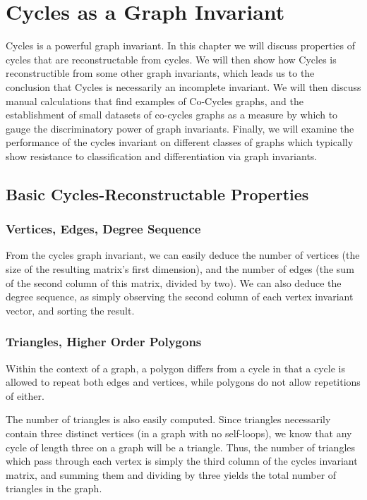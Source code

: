 \chapter{Cycles as a Graph Invariant}
Cycles is a powerful graph invariant.
In this chapter we will discuss properties of cycles that are reconstructable from cycles.
We will then show how Cycles is reconstructible from some other graph invariants, which leads us to the conclusion that Cycles is necessarily an incomplete invariant.
We will then discuss manual calculations that find examples of Co-Cycles graphs, and the establishment of small datasets of co-cycles graphs as a measure by which to gauge the discriminatory power of graph invariants.
Finally, we will examine the performance of the cycles invariant on different classes of graphs which typically show resistance to classification and differentiation via graph invariants.

\section{Basic Cycles-Reconstructable Properties}

\subsection{Vertices, Edges, Degree Sequence}
From the cycles graph invariant, we can easily deduce the number of vertices (the size of the resulting matrix's first dimension), and the number of edges (the sum of the second column of this matrix, divided by two).
We can also deduce the degree sequence, as simply observing the second column of each vertex invariant vector, and sorting the result.

\subsection{Triangles, Higher Order Polygons}
Within the context of a graph, a polygon differs from a cycle in that a cycle is allowed to repeat both edges and vertices, while polygons do not allow repetitions of either.

The number of triangles is also easily computed.  Since triangles necessarily contain three distinct vertices (in a graph with no self-loops), we know that any cycle of length three on a graph will be a triangle.
Thus, the number of triangles which pass through each vertex is simply the third column of the cycles invariant matrix, and summing them and dividing by three yields the total number of triangles in the graph.


